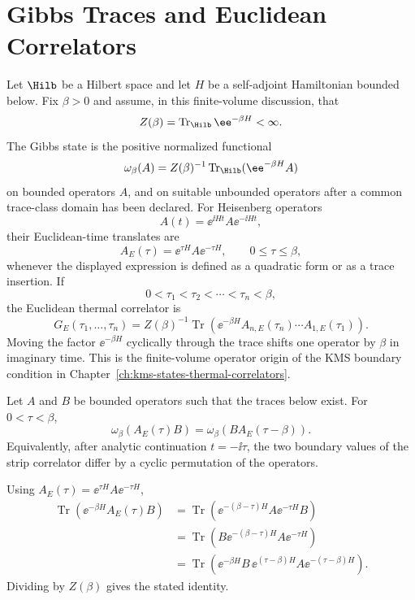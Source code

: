 \section{Gibbs Traces and Euclidean Correlators}

Let \(\Hilb\) be a Hilbert space and let \(H\) be a self-adjoint Hamiltonian
bounded below.  Fix \(\beta>0\) and assume, in this finite-volume discussion,
that
\[
  Z(\beta)=\operatorname{Tr}_{\Hilb}\ee^{-\beta H}<\infty .
\]
The Gibbs state is the positive normalized functional
\[
  \omega_\beta(A)
  =
  Z(\beta)^{-1}\operatorname{Tr}_{\Hilb}(\ee^{-\beta H}A)
\]
on bounded operators \(A\), and on suitable unbounded operators after a
common trace-class domain has been declared.  For Heisenberg operators
\[
  A(t)=\ee^{\ii Ht}A\ee^{-\ii Ht},
\]
their Euclidean-time translates are
\[
  A_E(\tau)=\ee^{\tau H}A\ee^{-\tau H},
  \qquad 0\leq \tau\leq\beta,
\]
whenever the displayed expression is defined as a quadratic form or as a
trace insertion.  If
\[
  0<\tau_1<\tau_2<\cdots<\tau_n<\beta ,
\]
the Euclidean thermal correlator is
\begin{equation}
  G_E(\tau_1,\ldots,\tau_n)
  =
  Z(\beta)^{-1}
  \operatorname{Tr}\!\left(
    \ee^{-\beta H}
    A_{n,E}(\tau_n)\cdots A_{1,E}(\tau_1)
  \right).
  \label{eq:thermal-euclidean-correlator-trace}
\end{equation}
Moving the factor \(\ee^{-\beta H}\) cyclically through the trace shifts one
operator by \(\beta\) in imaginary time.  This is the finite-volume operator
origin of the KMS boundary condition in
Chapter~\ref{ch:kms-states-thermal-correlators}.

\begin{remark}
\label{rem:trace-cyclicity-thermal-circle}
Let \(A\) and \(B\) be bounded operators such that the traces below exist.
For \(0<\tau<\beta\),
\[
  \omega_\beta(A_E(\tau)B)
  =
  \omega_\beta(B A_E(\tau-\beta)).
\]
Equivalently, after analytic continuation \(t=-\ii\tau\), the two boundary
values of the strip correlator differ by a cyclic permutation of the
operators.

Using \(A_E(\tau)=\ee^{\tau H}A\ee^{-\tau H}\),
\[
\begin{aligned}
  \operatorname{Tr}(\ee^{-\beta H}A_E(\tau)B)
  &=
  \operatorname{Tr}(\ee^{-(\beta-\tau)H}A\ee^{-\tau H}B)\\
  &=
  \operatorname{Tr}(B\ee^{-(\beta-\tau)H}A\ee^{-\tau H})\\
  &=
  \operatorname{Tr}(\ee^{-\beta H}B\,\ee^{(\tau-\beta)H}
  A\ee^{-(\tau-\beta)H}).
\end{aligned}
\]
Dividing by \(Z(\beta)\) gives the stated identity.
\end{remark}

